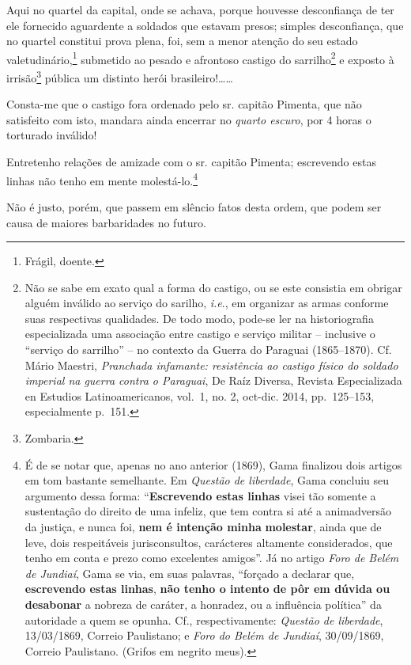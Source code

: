 Aqui no quartel da capital, onde se achava, porque houvesse desconfiança
de ter ele fornecido aguardente a soldados que estavam presos; simples
desconfiança, que no quartel constitui prova plena, foi, sem a menor
atenção do seu estado valetudinário,\footnote{ Frágil, doente.}
submetido ao pesado e afrontoso castigo do sarrilho\footnote{ Não se
  sabe em exato qual a forma do castigo, ou se este consistia em obrigar
  alguém inválido ao serviço do sarilho, \emph{i.e}., em organizar as
  armas conforme suas respectivas qualidades. De todo modo, pode-se ler
  na historiografia especializada uma associação entre castigo e serviço
  militar -- inclusive o ``serviço do sarrilho'' -- no contexto da
  Guerra do Paraguai (1865--1870). Cf. Mário Maestri, \emph{Pranchada
  infamante: resistência ao castigo físico do soldado imperial na guerra
  contra o Paraguai}, De Raíz Diversa, Revista Especializada en Estudios
  Latinoamericanos, vol.~1, no. 2, oct-dic. 2014, pp.~125--153,
  especialmente p.~151.} e exposto à irrisão\footnote{ Zombaria.}
pública um distinto herói brasileiro!\ldots\ldots{}

Consta-me que o castigo fora ordenado pelo sr. capitão Pimenta, que não
satisfeito com isto, mandara ainda encerrar no \emph{quarto escuro}, por
4 horas o torturado inválido!

Entretenho relações de amizade com o sr. capitão Pimenta; escrevendo
estas linhas não tenho em mente molestá-lo.\footnote{ É de se notar
  que, apenas no ano anterior (1869), Gama finalizou dois artigos em tom
  bastante semelhante. Em \emph{Questão de liberdade}, Gama concluiu seu
  argumento dessa forma: ``\textbf{Escrevendo estas linhas} visei tão
  somente a sustentação do direito de uma infeliz, que tem contra si até
  a animadversão da justiça, e nunca foi, \textbf{nem
  é intenção minha} \textbf{molestar}, ainda que de leve, dois
  respeitáveis jurisconsultos, carácteres altamente considerados, que
  tenho em conta e prezo como excelentes amigos''. Já no artigo
  \emph{Foro de Belém de Jundiaí}, Gama se via, em suas palavras,
  ``forçado a declarar que, \textbf{escrevendo estas linhas},
  \textbf{não tenho o intento de pôr em dúvida ou desabonar} a nobreza
  de caráter, a honradez, ou a influência política'' da autoridade a
  quem se opunha. Cf., respectivamente: \emph{Questão de liberdade},
  13/03/1869, Correio Paulistano; e \emph{Foro do Belém de Jundiaí},
  30/09/1869, Correio Paulistano. (Grifos em negrito meus).}

Não é justo, porém, que passem em slêncio fatos desta ordem, que podem
ser causa de maiores barbaridades no futuro.

